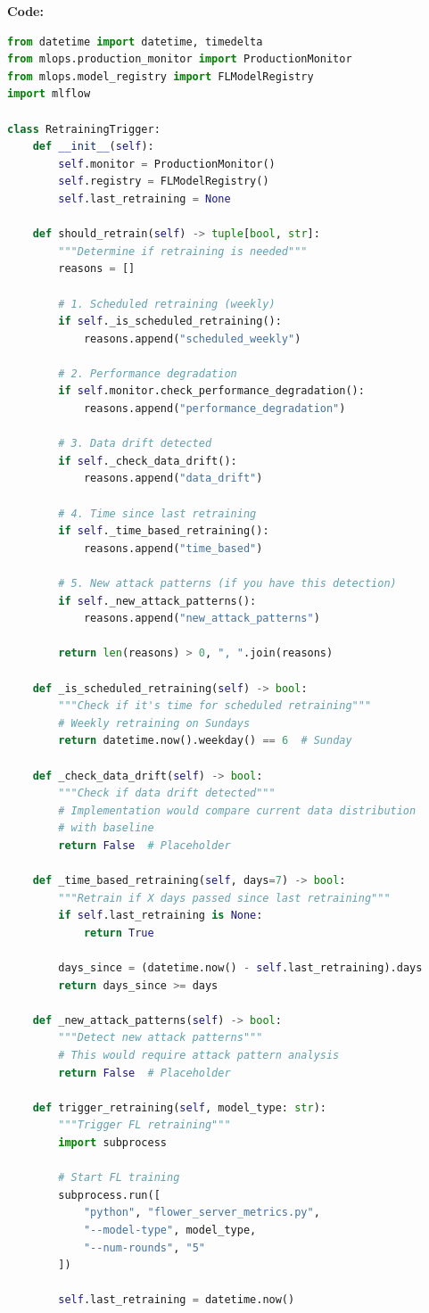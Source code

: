 \documentclass[12pt]{article}
\begin{document}
\textbf{Code:}
\begin{lstlisting}[language=Python]
from datetime import datetime, timedelta
from mlops.production_monitor import ProductionMonitor
from mlops.model_registry import FLModelRegistry
import mlflow

class RetrainingTrigger:
    def __init__(self):
        self.monitor = ProductionMonitor()
        self.registry = FLModelRegistry()
        self.last_retraining = None
    
    def should_retrain(self) -> tuple[bool, str]:
        """Determine if retraining is needed"""
        reasons = []
        
        # 1. Scheduled retraining (weekly)
        if self._is_scheduled_retraining():
            reasons.append("scheduled_weekly")
        
        # 2. Performance degradation
        if self.monitor.check_performance_degradation():
            reasons.append("performance_degradation")
        
        # 3. Data drift detected
        if self._check_data_drift():
            reasons.append("data_drift")
        
        # 4. Time since last retraining
        if self._time_based_retraining():
            reasons.append("time_based")
        
        # 5. New attack patterns (if you have this detection)
        if self._new_attack_patterns():
            reasons.append("new_attack_patterns")
        
        return len(reasons) > 0, ", ".join(reasons)
    
    def _is_scheduled_retraining(self) -> bool:
        """Check if it's time for scheduled retraining"""
        # Weekly retraining on Sundays
        return datetime.now().weekday() == 6  # Sunday
    
    def _check_data_drift(self) -> bool:
        """Check if data drift detected"""
        # Implementation would compare current data distribution
        # with baseline
        return False  # Placeholder
    
    def _time_based_retraining(self, days=7) -> bool:
        """Retrain if X days passed since last retraining"""
        if self.last_retraining is None:
            return True
        
        days_since = (datetime.now() - self.last_retraining).days
        return days_since >= days
    
    def _new_attack_patterns(self) -> bool:
        """Detect new attack patterns"""
        # This would require attack pattern analysis
        return False  # Placeholder
    
    def trigger_retraining(self, model_type: str):
        """Trigger FL retraining"""
        import subprocess
        
        # Start FL training
        subprocess.run([
            "python", "flower_server_metrics.py",
            "--model-type", model_type,
            "--num-rounds", "5"
        ])
        
        self.last_retraining = datetime.now()
\end{lstlisting}
\end{document}
